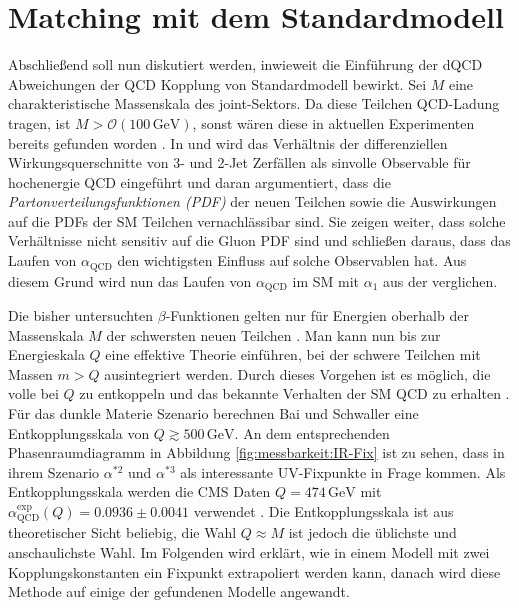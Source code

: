 \clearpage
\section{Matching mit dem Standardmodell}

  Abschließend soll nun diskutiert werden, inwieweit die Einführung der dQCD 
  Abweichungen der QCD Kopplung von Standardmodell bewirkt. Sei $M$ eine 
  charakteristische 
  Massenskala des joint-Sektors. Da diese Teilchen QCD-Ladung tragen, ist 
  $M > \mathcal{O}(100\,\text{GeV})$, sonst wären diese in aktuellen 
  Experimenten bereits gefunden worden 
  \cite{Scale_of_dark_QCD}\cite{Becciolini:2014lya}. In 
  \cite{Becciolini:2014lya} und \cite{Sannino} wird das Verhältnis 
  der differenziellen Wirkungsquerschnitte von 3- und 2-Jet Zerfällen als 
  sinvolle Observable für hochenergie QCD eingeführt
  und daran argumentiert, dass 
  die \textit{Partonverteilungsfunktionen (PDF)} der neuen Teilchen sowie die 
  Auswirkungen auf die PDFs der SM Teilchen vernachlässibar sind. Sie zeigen 
  weiter, dass solche Verhältnisse nicht sensitiv auf die Gluon PDF sind und 
  schließen daraus, dass das Laufen von $\alpha_\text{QCD}$ den wichtigsten 
  Einfluss auf solche Observablen hat. Aus diesem Grund wird nun das Laufen 
  von $\alpha_\text{QCD}$ im SM mit $\alpha_1$ aus der \QCDxdQCD verglichen. 
  
  Die bisher untersuchten $\beta$-Funktionen gelten nur für Energien oberhalb 
  der Massenskala $M$ der schwersten neuen Teilchen \cite{Becciolini:2014lya}. 
  Man kann nun bis zur Energieskala $Q$ eine effektive Theorie einführen, bei 
  der schwere Teilchen mit Massen $m > Q$ ausintegriert werden. 
  Durch dieses Vorgehen ist es möglich, die volle \QCDxdQCD bei $Q$ zu 
  entkoppeln und das bekannte Verhalten der SM QCD zu erhalten 
  \cite{Bednyakov2015262}. Für das dunkle Materie Szenario berechnen Bai und 
  Schwaller eine Entkopplungsskala von $Q \gtrsim 500\,\text{GeV}$. An dem 
  entsprechenden Phasenraumdiagramm in Abbildung \ref{fig:messbarkeit:IR-Fix}
  ist zu sehen, dass in ihrem Szenario $\alpha^{*2}$ und $\alpha^{*3}$ als 
  interessante UV-Fixpunkte in Frage kommen. Als Entkopplungsskala werden die 
  CMS Daten $Q=474\,\text{GeV}$ mit 
  $\alpha_\text{QCD}^\text{exp}(Q)=0.0936 \pm 0.0041$ verwendet
  \cite{Chatrchyan:2013txa}. Die Entkopplungsskala ist aus theoretischer Sicht 
  beliebig, die Wahl $ Q \approx M$ ist jedoch die üblichste und anschaulichste
  Wahl. Im Folgenden 
  wird erklärt, wie in einem Modell mit zwei Kopplungskonstanten ein Fixpunkt 
  extrapoliert werden kann, danach wird diese Methode auf einige der gefundenen 
  Modelle angewandt.
  
  
